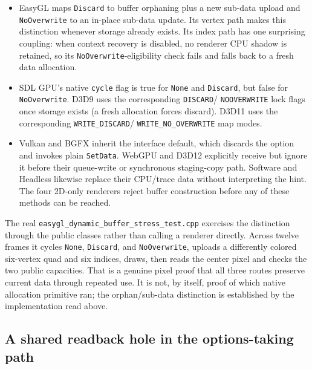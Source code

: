 \begin{itemize}
  \item EasyGL maps \texttt{Discard} to buffer orphaning plus a new sub-data upload and
    \texttt{NoOverwrite} to an in-place sub-data update. Its vertex path makes this distinction
    whenever storage already exists. Its index path has one surprising coupling: when context
    recovery is disabled, no renderer CPU shadow is retained, so its
    \texttt{NoOverwrite}-eligibility check fails and falls back to a fresh data allocation.
  \item SDL GPU's native \texttt{cycle} flag is true for \texttt{None} and
    \texttt{Discard}, but false for \texttt{NoOverwrite}. D3D9 uses the corresponding
    \texttt{DISCARD}/%
    \texttt{NO}\allowbreak{}\texttt{OVERWRITE} lock flags once storage exists (a fresh
    allocation forces discard). D3D11 uses the corresponding
    \texttt{WRITE\_}\allowbreak{}\texttt{DISCARD}/%
    \texttt{WRITE\_}\allowbreak{}\texttt{NO\_OVERWRITE} map modes.
  \item Vulkan and BGFX inherit the interface default, which discards the option and invokes
    plain \texttt{SetData}. WebGPU and D3D12 explicitly receive but ignore it before their
    queue-write or synchronous staging-copy path. Software and Headless likewise replace their
    CPU/trace data without interpreting the hint. The four 2D-only renderers reject buffer
    construction before any of these methods can be reached.
\end{itemize}

The real \texttt{easygl\_dynamic\_buffer\_stress\_test.cpp} exercises the distinction through
the public classes rather than calling a renderer directly. Across twelve frames it cycles
\texttt{None}, \texttt{Discard}, and \texttt{NoOverwrite}, uploads a differently colored
six-vertex quad and six indices, draws, then reads the center pixel and checks the two public
capacities. That is a genuine pixel proof that all three routes preserve current data through
repeated use. It is not, by itself, proof of which native allocation primitive ran; the
orphan/sub-data distinction is established by the implementation read above.

\subsection{A shared readback hole in the options-taking path}

